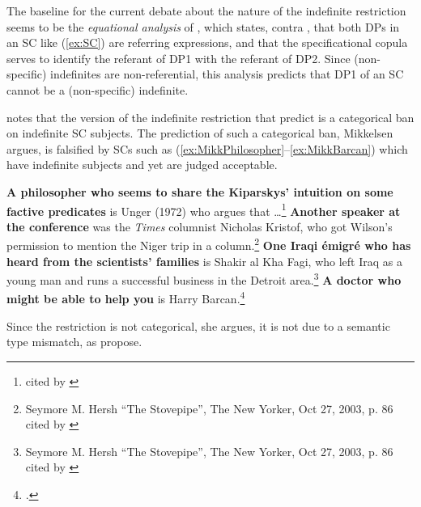 \documentclass[
	letterpaper,
]{article}
\begin{document}
The baseline for the current debate about the nature of the indefinite restriction seems to be the \textit{equational analysis} of \textcite{heycockkroch1999pseudocleft}, which states, contra \textcite{moro1997raising}, that both DPs in an SC like (\ref{ex:SC}) are referring expressions, and that the specificational copula serves to identify the referant of DP1 with the referant of DP2.
Since (non-specific) indefinites are non-referential, this analysis predicts that DP1 of an SC cannot be a (non-specific) indefinite.

\textcite{mikkelsen2005copular} notes that the version of the indefinite restriction that \textcite{heycockkroch1999pseudocleft} predict is a categorical ban on indefinite SC subjects.
The prediction of such a categorical ban, Mikkelsen argues, is falsified by SCs such as (\ref{ex:MikkPhilosopher}--\ref{ex:MikkBarcan}) which have indefinite subjects and yet are judged acceptable. 
\begin{exe}
	\ex\label{ex:MikkPhilosopher} \textbf{A philosopher who seems to share the Kiparskys' intuition on some factive predicates} is Unger (1972) who argues that \dots\footnote{\textcite[][p. 195 fn8]{delacruz1976factives} cited by \textcite[117]{mikkelsen2005copular}}
	\ex\label{ex:MikkSpeaker} \textbf{Another speaker at the conference} was the \textit{Times} columnist Nicholas Kristof, who got Wilson's permission to mention the Niger trip in a column.\footnote{Seymore M. Hersh ``The Stovepipe'', The New Yorker, Oct 27, 2003, p. 86 cited by \textcite[118]{mikkelsen2005copular}}
	\ex\label{ex:MikkEmigre} \textbf{One Iraqi \'emigr\'e who has heard from the scientists' families} is Shakir al Kha Fagi, who left Iraq as a young man and runs a successful business in the Detroit area.\footnote{Seymore M. Hersh ``The Stovepipe'', The New Yorker, Oct 27, 2003, p. 86 cited by \textcite[118]{mikkelsen2005copular}}
	\ex\label{ex:MikkBarcan} \textbf{A doctor who might be able to help you} is Harry Barcan.\footcite[118]{mikkelsen2005copular}
\end{exe}
Since the restriction is not categorical, she argues, it is not due to a semantic type mismatch, as \textcite{heycockkroch1999pseudocleft} propose.
\end{document}
